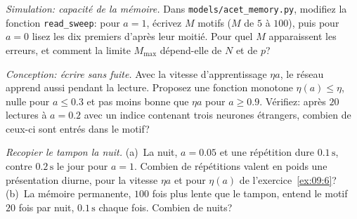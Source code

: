 \begin{exercise}[\lvlB]
\label{ex:09:5}
\emph{Simulation: capacité de la mémoire.} Dans \texttt{models/\allowbreak acet\_memory.py}, modifiez la fonction \texttt{read\_sweep}: pour $a=1$, écrivez $M$ motifs ($M$ de $5$ à $100$), puis pour $a=0$ lisez les dix premiers d'après leur moitié. Pour quel $M$ apparaissent les erreurs, et comment la limite $M_{\max}$ dépend-elle de $N$ et de $p$?
\end{exercise}

\begin{exercise}[\lvlB]
\label{ex:09:6}
\emph{Conception: écrire sans fuite.} Avec la vitesse d'apprentissage $\eta a$, le réseau apprend aussi pendant la lecture. Proposez une fonction monotone $\eta(a)\le\eta$, nulle pour $a\le0.3$ et pas moins bonne que $\eta a$ pour $a\ge0.9$. Vérifiez: après $20$ lectures à $a=0.2$ avec un indice contenant trois neurones étrangers, combien de ceux-ci sont entrés dans le motif?
\end{exercise}

\begin{exercise}[\lvlC]
\label{ex:09:7}
\emph{Recopier le tampon la nuit.} (a)~La nuit, $a=0.05$ et une répétition dure $0.1\,\text{s}$, contre $0.2\,\text{s}$ le jour pour $a=1$. Combien de répétitions valent en poids une présentation diurne, pour la vitesse $\eta a$ et pour $\eta(a)$ de l'exercice~\ref{ex:09:6}? (b)~La mémoire permanente, $100$ fois plus lente que le tampon, entend le motif $20$ fois par nuit, $0.1\,\text{s}$ chaque fois. Combien de nuits?
\end{exercise}
